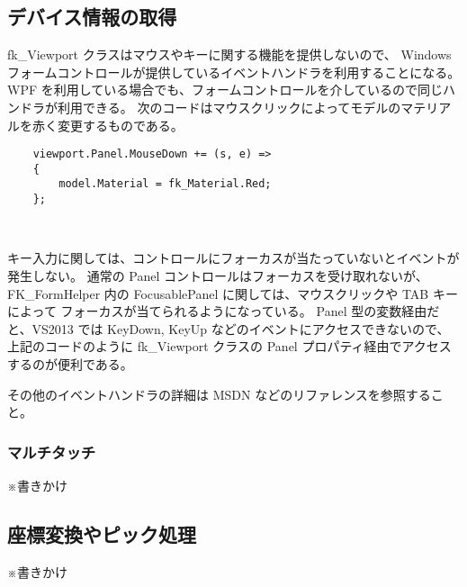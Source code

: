 \subsection{デバイス情報の取得}

fk\_Viewport クラスはマウスやキーに関する機能を提供しないので、
Windows フォームコントロールが提供しているイベントハンドラを利用することになる。
WPF を利用している場合でも、フォームコントロールを介しているので同じハンドラが利用できる。
次のコードはマウスクリックによってモデルのマテリアルを赤く変更するものである。
\\
\begin{screen}
\begin{verbatim}
    viewport.Panel.MouseDown += (s, e) =>
    {
        model.Material = fk_Material.Red;
    };
\end{verbatim}
\end{screen}
~

キー入力に関しては、コントロールにフォーカスが当たっていないとイベントが発生しない。
通常の Panel コントロールはフォーカスを受け取れないが、
FK\_FormHelper 内の FocusablePanel に関しては、マウスクリックや TAB キーによって
フォーカスが当てられるようになっている。
Panel 型の変数経由だと、VS2013 では KeyDown, KeyUp などのイベントにアクセスできないので、
上記のコードのように fk\_Viewport クラスの Panel プロパティ経由でアクセスするのが便利である。

その他のイベントハンドラの詳細は MSDN などのリファレンスを参照すること。

\subsubsection{マルチタッチ}

※書きかけ

\subsection{座標変換やピック処理}

※書きかけ
